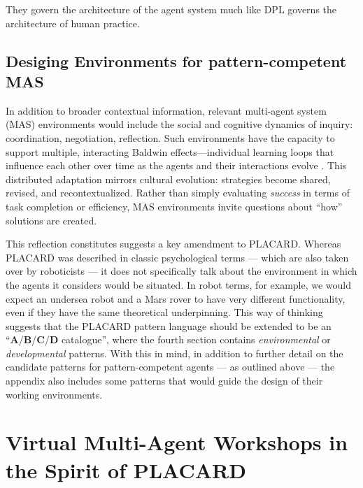 \documentclass[acmlarge,timestamp]{acmart}
\begin{document}
{They govern the architecture of the agent system much like DPL governs
the architecture of human practice.

\subsection{Desiging Environments for pattern-competent MAS}

In addition to broader contextual information, relevant multi-agent system (MAS) environments would include the social and cognitive dynamics of inquiry: coordination, negotiation, reflection.  Such environments have the capacity to support multiple, interacting Baldwin effects---individual learning loops that influence each other over time as the agents and their interactions evolve \cite{Redko}.  This distributed adaptation mirrors cultural evolution: strategies become shared, revised, and recontextualized.  Rather than simply evaluating \emph{success} in terms of task completion or efficiency, MAS environments invite questions about “how” solutions are created.

This reflection constitutes suggests a key amendment to PLACARD.
Whereas PLACARD was described in classic psychological terms
\cite{Hilgard1980} — which are also taken over by roboticists
\cite{cassimatis2004integrating} — it does not specifically talk about
the environment in which the agents it considers would be situated.
In robot terms, for example, we would expect an undersea robot and a
Mars rover to have very different functionality, even if they have the
same theoretical underpinning.  This way of thinking suggests that the
PLACARD pattern language should be extended to be an “\textbf{A}/\textbf{B}/\textbf{C}/\textbf{D}
catalogue”, where the fourth section contains \emph{environmental} or
\emph{developmental} patterns.  With this in mind, in addition to
further detail on the candidate patterns for pattern-competent agents
— as outlined above — the appendix also includes some patterns that
would guide the design of their working environments.  

\section{Virtual Multi-Agent Workshops in the Spirit of PLACARD}\label{sec:V}

}
\end{document}

